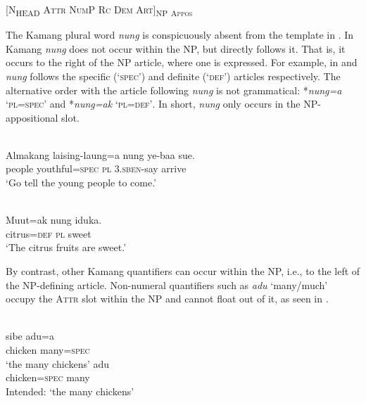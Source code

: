  [\textsc{N}\textsc{\textsubscript{HEAD}}\textsc{ Attr  NumP  Rc  Dem  Art]}\textsc{\textsubscript{NP}} \textsc{\textsubscript{Appos}}

\z


The Kamang plural word \textit{nung} is conspicuously absent from the template in . In Kamang \textit{nung} does not occur within the NP, but directly follows it. That is, it occurs to the right of the NP article, where one is expressed. For example, in  and  \textit{nung} follows the specific (`\textsc{spec}') and definite (`\textsc{def}') articles respectively. The alternative order with the article following \textit{nung} is not grammatical: *\textit{nung=a} `\textsc{pl=spec}' and *\textit{nung=ak} `\textsc{pl=def'}. In short, \textit{nung} only occurs in the NP-appositional slot.


\ea%
\label{ex:9:32}
 \\
\gll  Almakang laising-laung=a nung {ye}{{\textglotstop}}{-baa} sue. \\
  people youthful=\textsc{spec} \textsc{pl} \textsc{3.sben}-say arrive  \\
\glt `Go tell the young people to come.'
\z







\ea%
\label{ex:9:33}
 \\
\gll  Muut=ak nung iduka. \\
  citrus=\textsc{def} \textsc{pl} sweet   \\
\glt `The citrus fruits are sweet.'
\z






By contrast, other Kamang quantifiers can occur within the NP, i.e., to the left of the NP-defining article. Non-numeral quantifiers such as \textit{adu} `many/much' occupy the \textsc{Attr} slot within the NP and cannot float out of it, as seen in .


\ea%
\label{ex:9:34}
 \\
\ea
\gll sibe adu=a \\
  chicken many=\textsc{spec} \\
\glt `the many chickens' 
\ex
{} {adu} \\
chicken=\textsc{spec} many \\
\glt Intended: `the many chickens'
\z
\z



